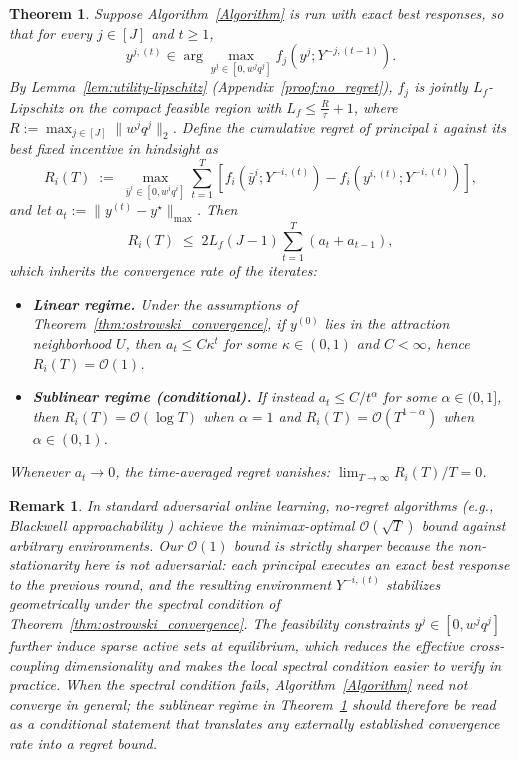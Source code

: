 \documentclass{article}
\newtheorem{remark}{Remark}
\newtheorem{theorem}{Theorem}
\begin{document}
\begin{theorem}
\label{thm:no_regret}
Suppose Algorithm~\ref{Algorithm} is run with exact best responses, so that for every $j\in[J]$ and $t\ge 1$,
\[
y^{j,(t)}\in\arg\max_{y^j\in[0,w^jq^j]} f_j(y^j;Y^{-j,(t-1)}).
\]
By Lemma~\ref{lem:utility-lipschitz} (Appendix~\ref{proof:no_regret}), $f_j$ is jointly $L_f$-Lipschitz on the compact feasible region with $L_f\le \frac{R}{\tau}+1$, where $R := \max_{j\in[J]}\|w^jq^j\|_2$. Define the cumulative regret of principal $i$ against its best fixed incentive in hindsight as
\[
R_i(T) \;:=\; \max_{\bar y^i \in [0, w^iq^i]} \sum_{t=1}^T \left[ f_i(\bar y^i; Y^{-i,(t)}) - f_i(y^{i,(t)}; Y^{-i,(t)}) \right],
\]
and let $a_t := \|y^{(t)}-y^\star\|_{\max}$. Then
\[
R_i(T) \;\le\; 2 L_f (J-1) \sum_{t=1}^T (a_t + a_{t-1}),
\]
which inherits the convergence rate of the iterates:
\begin{itemize}
    \item \textbf{Linear regime.} Under the assumptions of Theorem~\ref{thm:ostrowski_convergence}, if $y^{(0)}$ lies in the attraction neighborhood $U$, then $a_t \le C\kappa^t$ for some $\kappa\in(0,1)$ and $C<\infty$, hence $R_i(T) = \mathcal{O}(1)$.
    \item \textbf{Sublinear regime (conditional).} If instead $a_t \le C/t^\alpha$ for some $\alpha \in (0,1]$, then $R_i(T) = \mathcal{O}(\log T)$ when $\alpha=1$ and $R_i(T) = \mathcal{O}(T^{1-\alpha})$ when $\alpha\in(0,1)$.
\end{itemize}
Whenever $a_t \to 0$, the time-averaged regret vanishes: $\lim_{T\to\infty} R_i(T)/T = 0$.
\end{theorem}

\begin{remark}
In standard adversarial online learning, no-regret algorithms (e.g., Blackwell approachability \citep{blackwell1956analog}) achieve the minimax-optimal $\mathcal{O}(\sqrt{T})$ bound against arbitrary environments. Our $\mathcal{O}(1)$ bound is strictly sharper because the non-stationarity here is not adversarial: each principal executes an exact best response to the previous round, and the resulting environment $Y^{-i,(t)}$ stabilizes geometrically under the spectral condition of Theorem~\ref{thm:ostrowski_convergence}. The feasibility constraints $y^j \in [0, w^jq^j]$ further induce sparse active sets at equilibrium, which reduces the effective cross-coupling dimensionality and makes the local spectral condition easier to verify in practice. When the spectral condition fails, Algorithm~\ref{Algorithm} need not converge in general; the sublinear regime in Theorem~\ref{thm:no_regret} should therefore be read as a conditional statement that translates any externally established convergence rate into a regret bound.
\end{remark}
\end{document}
